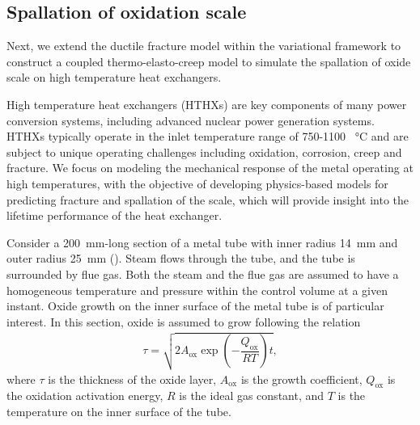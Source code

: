 \subsection{Spallation of oxidation scale}
\label{section: Chapter5/examples/spallation}

Next, we extend the ductile fracture model within the variational framework to construct a coupled thermo-elasto-creep model to simulate the spallation of oxide scale on high temperature heat exchangers.

High temperature heat exchangers (HTHXs) are key components of many power conversion systems, including advanced nuclear power generation systems. HTHXs typically operate in the inlet temperature range of 750-1100 \SI{}{\celsius} and are subject to unique operating challenges including oxidation, corrosion, creep and fracture.  We focus on modeling the mechanical response of the metal operating at high temperatures, with the objective of developing physics-based models for predicting fracture and spallation of the scale, which will provide insight into the lifetime performance of the heat exchanger.



Consider a \SI{200}{\milli\meter}-long section of a metal tube with inner radius \SI{14}{\milli\meter} and outer radius \SI{25}{\milli\meter} (). Steam flows through the tube, and the tube is surrounded by flue gas. Both the steam and the flue gas are assumed to have a homogeneous temperature and pressure within the control volume at a given instant. Oxide growth on the inner surface of the metal tube is of particular interest. In this section, oxide is assumed to grow following the relation
\begin{align}
  \tau = \sqrt{2A_\text{ox}\exp\left( -\dfrac{Q_\text{ox}}{RT} \right) t},
\end{align}
where $\tau$ is the thickness of the oxide layer, $A_\text{ox}$ is the growth coefficient, $Q_\text{ox}$ is the oxidation activation energy, $R$ is the ideal gas constant, and $T$ is the temperature on the inner surface of the tube.

